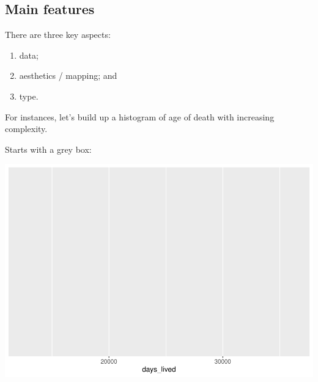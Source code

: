 \documentclass[
]{book}
\newenvironment{Shaded}{\begin{snugshade}}{\end{snugshade}}
\newcommand{\DataTypeTok}[1]{\textcolor[rgb]{0.13,0.29,0.53}{#1}}
\newcommand{\KeywordTok}[1]{\textcolor[rgb]{0.13,0.29,0.53}{\textbf{#1}}}
\newcommand{\NormalTok}[1]{#1}
\newcommand{\OperatorTok}[1]{\textcolor[rgb]{0.81,0.36,0.00}{\textbf{#1}}}
\newcommand{\StringTok}[1]{\textcolor[rgb]{0.31,0.60,0.02}{#1}}
\providecommand{\tightlist}{%
  \setlength{\itemsep}{0pt}\setlength{\parskip}{0pt}}
\begin{document}
\hypertarget{main-features}{%
\subsection{Main features}\label{main-features}}

There are three key aspects:

\begin{enumerate}
\def\labelenumi{\arabic{enumi}.}
\tightlist
\item
  data;
\item
  aesthetics / mapping; and
\item
  type.
\end{enumerate}

For instances, let's build up a histogram of age of death with increasing complexity.

Starts with a grey box:

\begin{Shaded}
\end{Shaded}

\includegraphics{telling_stories_with_data_files/figure-latex/unnamed-chunk-63-1.pdf}
\end{document}
